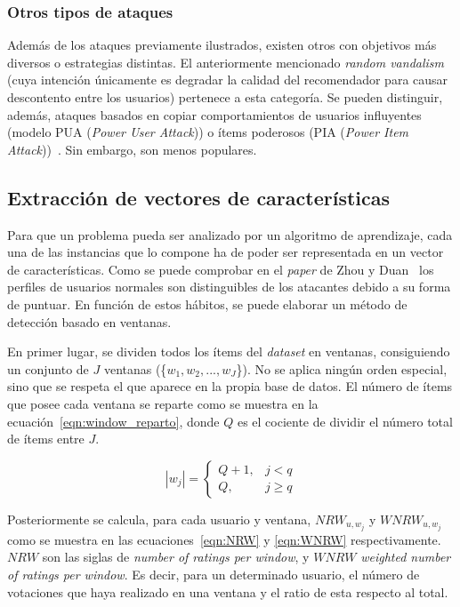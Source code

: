 \subsubsection{Otros tipos de ataques}

Además de los ataques previamente ilustrados, existen otros con objetivos más diversos o estrategias distintas. El anteriormente mencionado \textit{random vandalism} (cuya intención únicamente es degradar la calidad del recomendador para causar descontento entre los usuarios) pertenece a esta categoría. Se pueden distinguir, además, ataques basados en copiar comportamientos de usuarios influyentes (modelo PUA (\textit{Power User Attack})) o ítems poderosos (PIA (\textit{Power Item Attack}))~\cite{mingdan2018ShillingAttacksAReview}. Sin embargo, son menos populares.

\subsection{Extracción de vectores de características}
\label{sec:vectores_catacterísticas_ataquesisrec}

Para que un problema pueda ser analizado por un algoritmo de aprendizaje, cada una de las instancias que lo compone ha de poder ser representada en un vector de características. Como se puede comprobar en el \textit{paper} de Zhou y Duan~\cite{zhou2021SemisupervisedRecommendationAttack} los perfiles de usuarios normales son distinguibles de los atacantes debido a su forma de puntuar. En función de estos hábitos, se puede elaborar un método de detección basado en ventanas.

En primer lugar, se dividen todos los ítems del \textit{dataset} en ventanas, consiguiendo un conjunto de $J$ ventanas (\{$w_1, w_2, ..., w_J$\}). No se aplica ningún orden especial, sino que se respeta el que aparece en la propia base de datos. El número de ítems que posee cada ventana se reparte como se muestra en la ecuación~\ref{eqn:window_reparto}, donde $Q$ es el cociente de dividir el número total de ítems entre $J$.

\[|w_j| = \left\{ \begin{array}{lr} Q + 1, & j < q\\ Q, & j \ge q \label{eqn:window_reparto} \end{array} \right. \] 

Posteriormente se calcula, para cada usuario y ventana, $NRW_{u, w_j}$ y  $WNRW_{u, w_j}$ como se muestra en las ecuaciones~\ref{eqn:NRW} y \ref{eqn:WNRW} respectivamente. $NRW$ son las siglas de \textit{number of ratings per window}, y $WNRW$ \textit{weighted number of ratings per window}. Es decir, para un determinado usuario, el número de votaciones que haya realizado en una ventana y el ratio de esta respecto al total.

